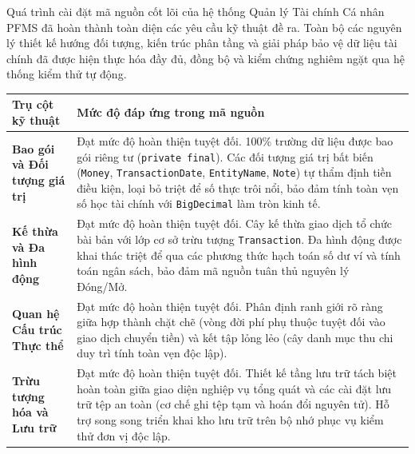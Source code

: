 \documentclass[a4paper,12pt]{report}
\newcommand{\passthrough}[1]{#1}
\newcounter{none}
\begin{document}
Quá trình cài đặt mã nguồn cốt lõi của hệ thống Quản lý Tài chính Cá
nhân PFMS đã hoàn thành toàn diện các yêu cầu kỹ thuật đề ra. Toàn bộ
các nguyên lý thiết kế hướng đối tượng, kiến trúc phân tầng và giải pháp
bảo vệ dữ liệu tài chính đã được hiện thực hóa đầy đủ, đồng bộ và kiểm
chứng nghiêm ngặt qua hệ thống kiểm thử tự động.

{\def\LTcaptype{none} %
\begin{longtable}[]{@{}
  >{\raggedright\arraybackslash}p{}
  >{\raggedright\arraybackslash}p{}@{}}
\toprule\noalign{}
\begin{minipage}[b]{\linewidth}\raggedright
Trụ cột kỹ thuật
\end{minipage} & \begin{minipage}[b]{\linewidth}\raggedright
Mức độ đáp ứng trong mã nguồn
\end{minipage} \\
\midrule\noalign{}
\endhead
\bottomrule\noalign{}
\endlastfoot
\textbf{Bao gói và Đối tượng giá trị} & Đạt mức độ hoàn thiện tuyệt đối.
100\% trường dữ liệu được bao gói riêng tư
(\passthrough{\lstinline!private final!}). Các đối tượng giá trị bất
biến (\passthrough{\lstinline!Money!},
\passthrough{\lstinline!TransactionDate!},
\passthrough{\lstinline!EntityName!}, \passthrough{\lstinline!Note!}) tự
thẩm định tiền điều kiện, loại bỏ triệt để số thực trôi nổi, bảo đảm
tính toàn vẹn số học tài chính với \passthrough{\lstinline!BigDecimal!}
làm tròn kinh tế. \\
\textbf{Kế thừa và Đa hình động} & Đạt mức độ hoàn thiện tuyệt đối. Cây
kế thừa giao dịch tổ chức bài bản với lớp cơ sở trừu tượng
\passthrough{\lstinline!Transaction!}. Đa hình động được khai thác triệt
để qua các phương thức hạch toán số dư ví và tính toán ngân sách, bảo
đảm mã nguồn tuân thủ nguyên lý Đóng/Mở. \\
\textbf{Quan hệ Cấu trúc Thực thể} & Đạt mức độ hoàn thiện tuyệt đối.
Phân định ranh giới rõ ràng giữa hợp thành chặt chẽ (vòng đời phí phụ
thuộc tuyệt đối vào giao dịch chuyển tiền) và kết tập lỏng lẻo (cây danh
mục thu chi duy trì tính toàn vẹn độc lập). \\
\textbf{Trừu tượng hóa và Lưu trữ} & Đạt mức độ hoàn thiện tuyệt đối.
Thiết kế tầng lưu trữ tách biệt hoàn toàn giữa giao diện nghiệp vụ tổng
quát và các cài đặt lưu trữ tệp an toàn (cơ chế ghi tệp tạm và hoán đổi
nguyên tử). Hỗ trợ song song triển khai kho lưu trữ trên bộ nhớ phục vụ
kiểm thử đơn vị độc lập. \\

\end{longtable}}
\end{document}

